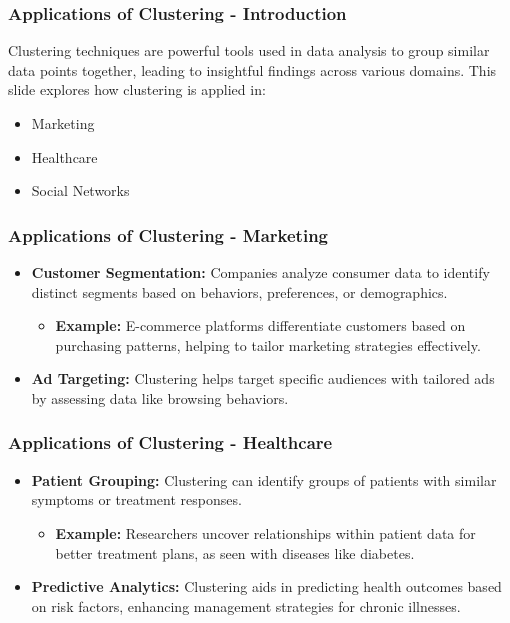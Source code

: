 \documentclass{beamer}
\begin{document}
\begin{frame}[fragile]
    \frametitle{Applications of Clustering - Introduction}
    Clustering techniques are powerful tools used in data analysis to group similar data points together, leading to insightful findings across various domains. This slide explores how clustering is applied in:
    \begin{itemize}
        \item Marketing
        \item Healthcare
        \item Social Networks
    \end{itemize}
\end{frame}

\begin{frame}[fragile]
    \frametitle{Applications of Clustering - Marketing}
    \begin{itemize}
        \item \textbf{Customer Segmentation:} 
        Companies analyze consumer data to identify distinct segments based on behaviors, preferences, or demographics.
        \begin{itemize}
            \item \textbf{Example:} E-commerce platforms differentiate customers based on purchasing patterns, helping to tailor marketing strategies effectively.
        \end{itemize}
        
        \item \textbf{Ad Targeting:} 
        Clustering helps target specific audiences with tailored ads by assessing data like browsing behaviors.
    \end{itemize}
\end{frame}

\begin{frame}[fragile]
    \frametitle{Applications of Clustering - Healthcare}
    \begin{itemize}
        \item \textbf{Patient Grouping:} 
        Clustering can identify groups of patients with similar symptoms or treatment responses.
        \begin{itemize}
            \item \textbf{Example:} Researchers uncover relationships within patient data for better treatment plans, as seen with diseases like diabetes.
        \end{itemize}
        
        \item \textbf{Predictive Analytics:} 
        Clustering aids in predicting health outcomes based on risk factors, enhancing management strategies for chronic illnesses.
    \end{itemize}
\end{frame}
\end{document}

